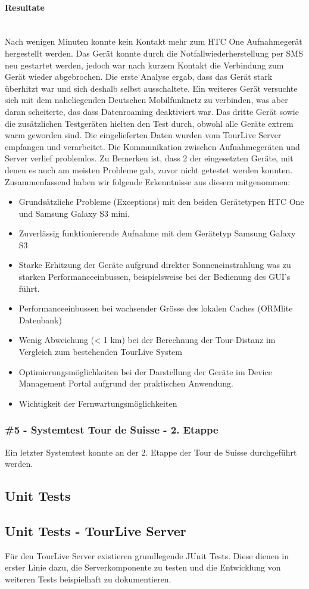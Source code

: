 \paragraph*{Resultate} \mbox{} \\
Nach wenigen Minuten konnte kein Kontakt mehr zum HTC One Aufnahmegerät hergestellt werden. Das Gerät konnte durch die Notfallwiederherstellung per SMS neu gestartet werden, jedoch war nach kurzem Kontakt die Verbindung zum Gerät wieder abgebrochen. Die erste Analyse ergab, dass das Gerät stark überhitzt war und sich deshalb selbst ausschaltete. Ein weiteres Gerät versuchte sich mit dem naheliegenden Deutschen Mobilfunknetz zu verbinden, was aber daran scheiterte, das dass Datenroaming deaktiviert war. Das dritte Gerät sowie die zusätzlichen Testgeräten hielten den Test durch, obwohl alle Geräte extrem warm geworden sind. Die eingelieferten Daten wurden vom TourLive Server empfangen und verarbeitet. Die Kommunikation zwischen Aufnahmegeräten und Server verlief problemlos. Zu Bemerken ist, dass 2 der eingesetzten Geräte, mit denen es auch am meisten Probleme gab, zuvor nicht getestet werden konnten. Zusammenfassend haben wir folgende Erkenntnisse aus diesem mitgenommen:
\begin{itemize} [noitemsep,topsep=0pt]
	\item Grundsätzliche Probleme (Exceptions) mit den beiden Gerätetypen HTC One und Samsung Galaxy S3 mini. 
	\item Zuverlässig funktionierende Aufnahme mit dem Gerätetyp Samsung Galaxy S3
	\item Starke Erhitzung der Geräte aufgrund direkter Sonneneinstrahlung was zu starken Performanceeinbussen, beispielsweise bei der Bedienung des GUI's führt.
	\item Performanceeinbussen bei wachsender Grösse des lokalen Caches (ORMlite Datenbank)
	\item Wenig Abweichung (< 1 km) bei der Berechnung der Tour-Distanz im Vergleich zum bestehenden TourLive System
	\item Optimierungsmöglichkeiten bei der Darstellung der Geräte im Device Management Portal aufgrund der praktischen Anwendung.
	\item Wichtigkeit der Fernwartungsmöglichkeiten
\end{itemize}

\subsubsection{\#5 - Systemtest Tour de Suisse - 2. Etappe}
Ein letzter Systemtest konnte an der 2. Etappe der Tour de Suisse durchgeführt werden.

\subsection{Unit Tests}
\label{sec:unittests}
\subsection{Unit Tests - TourLive Server}
Für den TourLive Server existieren grundlegende JUnit Tests. Diese dienen in erster Linie dazu, die Serverkomponente zu testen und die Entwicklung von weiteren Tests beispielhaft zu dokumentieren.